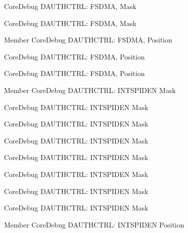 \begin{DoxyRefList}
\label{deprecated__deprecated000637}%
%
Core\+Debug DAUTHCTRL\+: FSDMA, Mask 

\label{deprecated__deprecated000084}%
%
Core\+Debug DAUTHCTRL\+: FSDMA, Mask  
\item[Member \doxylink{group__CMSIS__SCB_ga2b4fde73cbbbb0adeb686dc20ff705de}{Core\+Debug\+\_\+\+DAUTHCTRL\+\_\+\+FSDMA\+\_\+\+Pos} ]\label{deprecated__deprecated000534}%
%
Core\+Debug DAUTHCTRL\+: FSDMA, Position 

\label{deprecated__deprecated000636}%
%
Core\+Debug DAUTHCTRL\+: FSDMA, Position 

\label{deprecated__deprecated000083}%
%
Core\+Debug DAUTHCTRL\+: FSDMA, Position  
\item[Member \doxylink{group__CMSIS__SCB_ga1570f149a0f89f70fc2644a5842cbcb4}{Core\+Debug\+\_\+\+DAUTHCTRL\+\_\+\+INTSPIDEN\+\_\+\+Msk} ]\label{deprecated__deprecated000541}%
%
Core\+Debug DAUTHCTRL\+: INTSPIDEN Mask 

\label{deprecated__deprecated000362}%
%
Core\+Debug DAUTHCTRL\+: INTSPIDEN Mask 

\label{deprecated__deprecated000283}%
%
Core\+Debug DAUTHCTRL\+: INTSPIDEN Mask 

\label{deprecated__deprecated000438}%
%
Core\+Debug DAUTHCTRL\+: INTSPIDEN Mask 

\label{deprecated__deprecated000144}%
%
Core\+Debug DAUTHCTRL\+: INTSPIDEN Mask 

\label{deprecated__deprecated000090}%
%
Core\+Debug DAUTHCTRL\+: INTSPIDEN Mask 

\label{deprecated__deprecated000220}%
%
Core\+Debug DAUTHCTRL\+: INTSPIDEN Mask 

\label{deprecated__deprecated000643}%
%
Core\+Debug DAUTHCTRL\+: INTSPIDEN Mask  
\item[Member \doxylink{group__CMSIS__SCB_ga3caef9790e4e2ccbfea77d55315ad59f}{Core\+Debug\+\_\+\+DAUTHCTRL\+\_\+\+INTSPIDEN\+\_\+\+Pos} ]\label{deprecated__deprecated000642}%
%
Core\+Debug DAUTHCTRL\+: INTSPIDEN Position 


\end{DoxyRefList}
